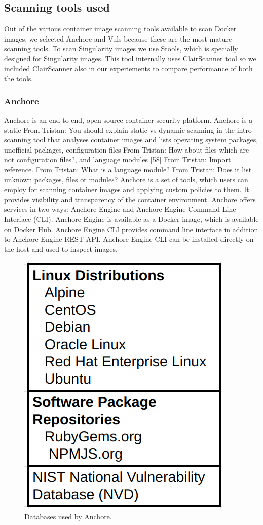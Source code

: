 \documentclass[a4paper,num-refs]{oup-contemporary}
\newcommand{\TG}[1]{\color{blue}From Tristan: #1\color{black}}
\begin{document}
\subsection{Scanning tools used}

Out of the various container image scanning tools available to scan Docker images,
we selected Anchore
and Vuls because these are the most mature scanning tools. To scan Singularity images
we use Stools, which is specially designed for Singularity images. This tool internally uses
ClairScanner tool so we included ClairScanner also in our experiements to compare
performance of both the tools.

\subsubsection{Anchore}

Anchore is an end-to-end, open-source container security platform. Anchore
is a static \TG{You should explain static vs dynamic scanning in the intro}
scanning tool that analyses container images and lists operating system
packages, unofficial packages, configuration files \TG{How about files
which are not configuration files?}, and language modules [58] \TG{Import
reference}. \TG{What is a language module?} \TG{Does it list unknown
packages, files or modules?} Anchore is a set of tools, which users can
employ for scanning container images and applying custom policies to them.
It provides visibility and transparency of the container environment.
Anchore offers services in two ways: Anchore Engine and Anchore Engine
Command Line Interface (CLI). Anchore Engine is available as a Docker
image, which is available on Docker Hub. Anchore Engine CLI provides
command line interface in addition to Anchore Engine REST API. Anchore
Engine CLI can be installed directly on the host and used to inspect
images.

\begin{figure}
  \centering
  \includegraphics[width=.7\columnwidth]{Figures/anchore.png}
  \caption{Databases used by Anchore.}
        \label{fig:anchore_db}
\end{figure}
\end{document}
